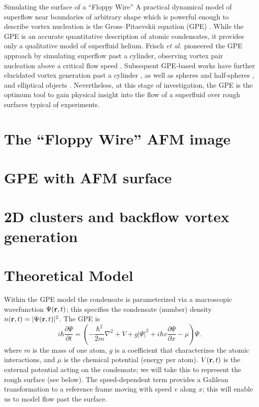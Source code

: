 \begin{chapter}{\label{cha:afm}Simulating the surface of a ``Floppy Wire''}
A practical dynamical model of superflow near boundaries of arbitrary
shape which is powerful enough to describe vortex nucleation is
the Gross--Pitaevskii equation (GPE) \cite{RobertsBerloff}.  While the GPE is an accurate quantitative description of atomic condensates, it provides only a qualitative model of superfluid helium.  Frisch {\it et al.} pioneered the GPE approach by simulating superflow past a cylinder, observing vortex pair nucleation above a critical flow speed \cite{frisch92}.  Subsequent GPE-based works have further elucidated vortex generation past a cylinder \cite{nore93,jma99,saito10}, as well as spheres and half-spheres \cite{winiecki99}, and elliptical objects \cite{stagg_parker_14}.    Nevertheless, at this stage of investigation, the GPE is the optimum tool 
to gain physical insight into the flow of a superfluid over
rough surfaces typical of experiments.
\section{\label{section:afmimage} The ``Floppy Wire'' AFM image}
\section{\label{section:gpeafm} GPE with AFM surface}
\section{\label{section:2dafm} 2D clusters and backflow vortex generation}
\section{Theoretical Model}
Within the GPE model the condensate is parameterized via a macroscopic wavefunction $\Psi({\bf r},{t})$; this specifies the condensate (number) density $n({\bf r},{t})=|\Psi({\bf r},{t})|^2$.  The GPE is
\begin{equation}
i \hbar \frac{\partial\Psi}{\partial t} 
= \left(-\frac{\hbar^2}{2m}\nabla^2 + V + g|\Psi|^2 + i \hbar v \frac{\partial \Psi}{\partial x} - \mu \right) \Psi.
\label{eq:gpe1}
\end{equation}
\noindent
where $m$ is the mass of one atom, $g$ is a coefficient that characterizes the atomic interactions, and $\mu$ is the chemical potential (energy
per atom).  $V({\bf r},t)$ is the external potential acting on the condensate; we will take this to represent the rough surface (see below).  The speed-dependent term provides a Galilean transformation to a reference frame moving with speed $v$ along $x$; this will enable us to model flow past the surface.


\end{chapter}
